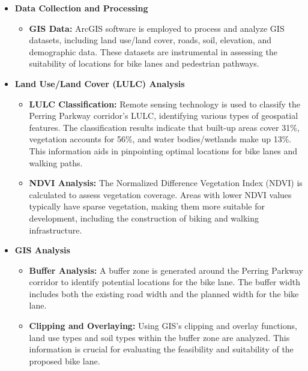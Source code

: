 \documentclass{mcmthesis}
\begin{document}
\begin{itemize}
    \item \textbf{Data Collection and Processing}
            \begin{itemize}
                \item \textbf{GIS Data:} ArcGIS software is employed to process and analyze GIS datasets, including land use/land cover, roads, soil, elevation, and demographic data. These datasets are instrumental in assessing the suitability of locations for bike lanes and pedestrian pathways.
            \end{itemize}
            


    \item \textbf{Land Use/Land Cover (LULC) Analysis}
    
            \begin{itemize}
                \item \textbf{LULC Classification:} Remote sensing technology is used to classify the Perring Parkway corridor’s LULC, identifying various types of geospatial features. The classification results indicate that built-up areas cover 31\%, vegetation accounts for 56\%, and water bodies/wetlands make up 13\%. This information aids in pinpointing optimal locations for bike lanes and walking paths.

                \item \textbf{NDVI Analysis:} The Normalized Difference Vegetation Index (NDVI) is calculated to assess vegetation coverage. Areas with lower NDVI values typically have sparse vegetation, making them more suitable for development, including the construction of biking and walking infrastructure.
            \end{itemize}


    \item \textbf{GIS Analysis}
    
            \begin{itemize}
                \item \textbf{Buffer Analysis:} A buffer zone is generated around the Perring Parkway corridor to identify potential locations for the bike lane. The buffer width includes both the existing road width and the planned width for the bike lane.

                \item \textbf{Clipping and Overlaying:} Using GIS’s clipping and overlay functions, land use types and soil types within the buffer zone are analyzed. This information is crucial for evaluating the feasibility and suitability of the proposed bike lane.


\end{itemize}
\end{itemize}
\end{document}
